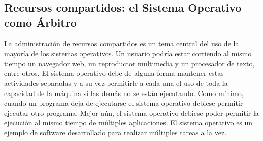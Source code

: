 \documentclass[10pt]{book}
\begin{document}
\subsection{Recursos compartidos: el Sistema Operativo como Árbitro}
La administración de recursos compartidos es un tema central del uso de la mayoría de los sistemas operativos. Un usuario podría estar corriendo al mismo tiempo un navegador web, un reproductor multimedia y un procesador de texto, entre otros. El sistema operativo debe de alguna forma mantener estas actividades separadas y a su vez permitirle a cada una el uso de toda la capacidad de la máquina si las demás no se están ejecutando. Como mínimo, cuando un programa deja de ejecutarse el sistema operativo debiese permitir ejecutar otro programa. Mejor aún, el sistema operativo debiese poder permitir la ejecución al mismo tiempo de múltiples aplicaciones. El sistema operativo es un ejemplo de software desarrollado para realizar múltiples tareas a la vez.
\end{document}
